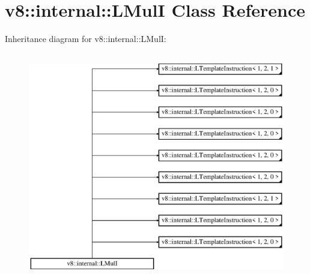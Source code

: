 \hypertarget{classv8_1_1internal_1_1_l_mul_i}{}\section{v8\+:\+:internal\+:\+:L\+MulI Class Reference}
\label{classv8_1_1internal_1_1_l_mul_i}
Inheritance diagram for v8\+:\+:internal\+:\+:L\+MulI\+:\begin{figure}[H]
\begin{center}
\leavevmode
\includegraphics[height=10.000000cm]{classv8_1_1internal_1_1_l_mul_i}
\end{center}
\end{figure}

